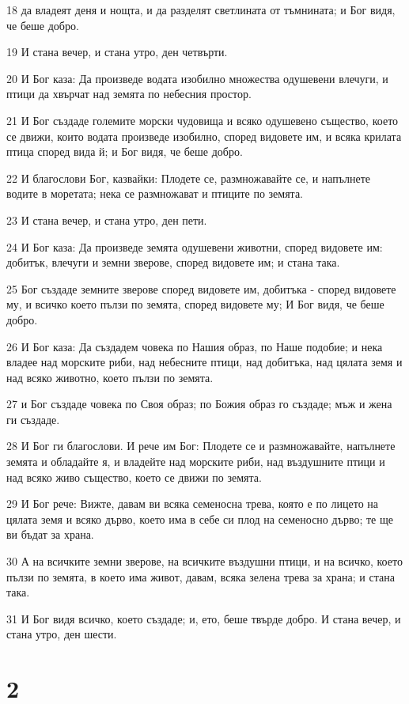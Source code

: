 \par 18 да владеят деня и нощта, и да разделят светлината от тъмнината; и Бог видя, че беше добро.
\par 19 И стана вечер, и стана утро, ден четвърти.
\par 20 И Бог каза: Да произведе водата изобилно множества одушевени влечуги, и птици да хвърчат над земята по небесния простор.
\par 21 И Бог създаде големите морски чудовища и всяко одушевено същество, което се движи, които водата произведе изобилно, според видовете им, и всяка крилата птица според вида й; и Бог видя, че беше добро.
\par 22 И благослови Бог, казвайки: Плодете се, размножавайте се, и напълнете водите в моретата; нека се размножават и птиците по земята.
\par 23 И стана вечер, и стана утро, ден пети.
\par 24 И Бог каза: Да произведе земята одушевени животни, според видовете им: добитък, влечуги и земни зверове, според видовете им; и стана така.
\par 25 Бог създаде земните зверове според видовете им, добитъка - според видовете му, и всичко което пълзи по земята, според видовете му; И Бог видя, че беше добро.
\par 26 И Бог каза: Да създадем човека по Нашия образ, по Наше подобие; и нека владее над морските риби, над небесните птици, над добитъка, над цялата земя и над всяко животно, което пълзи по земята.
\par 27 и Бог създаде човека по Своя образ; по Божия образ го създаде; мъж и жена ги създаде.
\par 28 И Бог ги благослови. И рече им Бог: Плодете се и размножавайте, напълнете земята и обладайте я, и владейте над морските риби, над въздушните птици и над всяко живо същество, което се движи по земята.
\par 29 И Бог рече: Вижте, давам ви всяка семеносна трева, която е по лицето на цялата земя и всяко дърво, което има в себе си плод на семеносно дърво; те ще ви бъдат за храна.
\par 30 А на всичките земни зверове, на всичките въздушни птици, и на всичко, което пълзи по земята, в което има живот, давам, всяка зелена трева за храна; и стана така.
\par 31 И Бог видя всичко, което създаде; и, ето, беше твърде добро. И стана вечер, и стана утро, ден шести.

\chapter{2}

